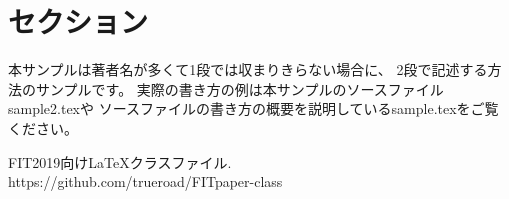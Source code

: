 \documentclass{FITpaper}
\begin{document}
\maketitle

\section{セクション}

本サンプルは著者名が多くて1段では収まりきらない場合に、
2段で記述する方法のサンプルです。
実際の書き方の例は本サンプルのソースファイルsample2.texや
ソースファイルの書き方の概要を説明しているsample.texをご覧ください。

\begin{thebibliography}{9}

  FIT2019向け\LaTeX クラスファイル. \\
  https://github.com/trueroad/FITpaper-class

\end{thebibliography}
\end{document}
